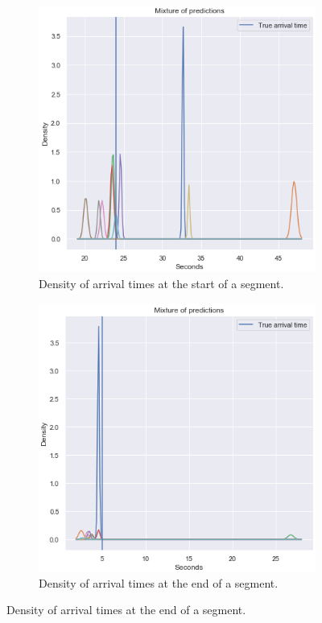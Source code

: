 \begin{figure}[H]
	\caption{Density comparison}
  \begin{subfigure}[b]{0.5\textwidth}
    \includegraphics[width=\textwidth]{figures/mixture-start-of-traj.png}
    \caption{Density of arrival times at the start of a segment.}
    \label{fig:mixture-start-of-traj}
  \end{subfigure}
  \begin{subfigure}[b]{0.5\textwidth}
    \includegraphics[width=\textwidth]{figures/mixture-end-of-traj.png}
    \caption{Density of arrival times at the end of a segment.}
    \label{fig:mixture-end-of-traj}
  \end{subfigure}
\end{figure}
